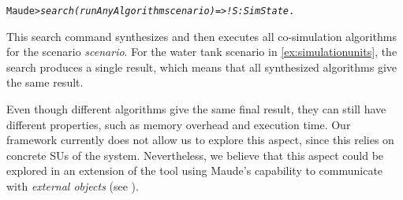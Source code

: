 \small
\begin{alltt}
Maude> \emph{search (runAnyAlgorithm scenario)  =>! S:SimState} . 
\end{alltt}
\normalsize

This search command synthesizes and then executes all co-simulation algorithms for the scenario \emph{scenario}. 
For the water tank scenario in \cref{ex:simulationunits}, the search produces a single result, which means that all synthesized algorithms give the same result.


Even though different algorithms give the same final result, they can still have different properties, such as memory overhead and execution time. 
Our framework currently does not allow us to explore this aspect, since this relies on concrete SUs of the system.
Nevertheless, we believe that this aspect could be explored in an extension of the tool using Maude's capability to communicate with \emph{external objects} (see \cite[Sect. 9]{maudemanual}).